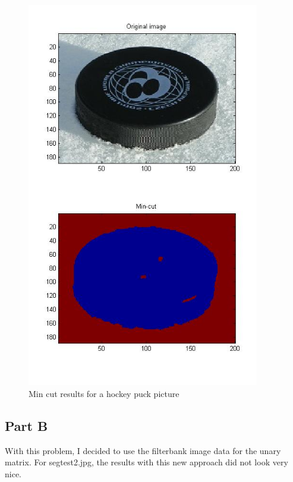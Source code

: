 \documentclass[11pt,psfig]{article}
\begin{document}
\begin{figure}[H]
\centering
\includegraphics[width=4in]{prob5plotA_3.jpg}
\caption{Min cut results for a hockey puck picture}
\end{figure}

\subsection*{Part B}

With this problem, I decided to use the filterbank image data for the unary matrix. For segtest2.jpg, the results with this new approach did not look very nice. 
\end{document}
